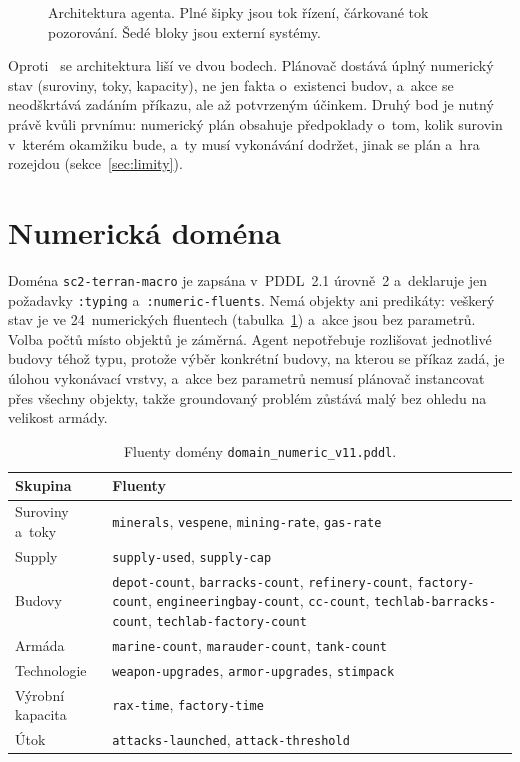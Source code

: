 \begin{figure}[ht]
	\centering
	
	\caption[Architektura agenta.]{Architektura agenta. Plné šipky jsou tok řízení, čárkované tok pozorování. Šedé bloky jsou externí systémy.}
	\label{fig:architektura}
\end{figure}

Oproti~\cite{Orava2025} se architektura liší ve dvou bodech. Plánovač dostává úplný numerický stav (suroviny, toky, kapacity), ne jen fakta o~existenci budov, a~akce se neodškrtává zadáním příkazu, ale až potvrzeným účinkem. Druhý bod je nutný právě kvůli prvnímu: numerický plán obsahuje předpoklady o~tom, kolik surovin v~kterém okamžiku bude, a~ty musí vykonávání dodržet, jinak se plán a~hra rozejdou (sekce~\ref{sec:limity}).

\section{Numerická doména}
\label{sec:domena}

Doména \texttt{sc2-terran-macro} je zapsána v~PDDL~2.1 úrovně~2 a~deklaruje jen požadavky \texttt{:typing} a~\texttt{:numeric-fluents}. Nemá objekty ani predikáty: veškerý stav je ve 24~numerických fluentech (tabulka~\ref{tab:fluenty}) a~akce jsou bez parametrů. Volba počtů místo objektů je záměrná. Agent nepotřebuje rozlišovat jednotlivé budovy téhož typu, protože výběr konkrétní budovy, na kterou se příkaz zadá, je úlohou vykonávací vrstvy, a~akce bez parametrů nemusí plánovač instancovat přes všechny objekty, takže groundovaný problém zůstává malý bez ohledu na velikost armády.

\begin{table}[ht]
	\centering
	\caption{Fluenty domény \texttt{domain\_numeric\_v11.pddl}.}
	\label{tab:fluenty}
	\begin{tabularx}{\textwidth}{@{} l >{\raggedright\arraybackslash}X @{}}
		\toprule
		\textbf{Skupina} & \textbf{Fluenty} \\
		\midrule
		Suroviny a~toky & \texttt{minerals}, \texttt{vespene}, \texttt{mining-rate}, \texttt{gas-rate} \\
		Supply & \texttt{supply-used}, \texttt{supply-cap} \\
		Budovy & \texttt{depot-count}, \texttt{barracks-count}, \texttt{refinery-count}, \texttt{factory-count}, \texttt{engineeringbay-count}, \texttt{cc-count}, \texttt{techlab-barracks-count}, \texttt{techlab-factory-count} \\
		Armáda & \texttt{marine-count}, \texttt{marauder-count}, \texttt{tank-count} \\
		Technologie & \texttt{weapon-upgrades}, \texttt{armor-upgrades}, \texttt{stimpack} \\
		Výrobní kapacita & \texttt{rax-time}, \texttt{factory-time} \\
		Útok & \texttt{attacks-launched}, \texttt{attack-threshold} \\
		\bottomrule
	\end{tabularx}
\end{table}

